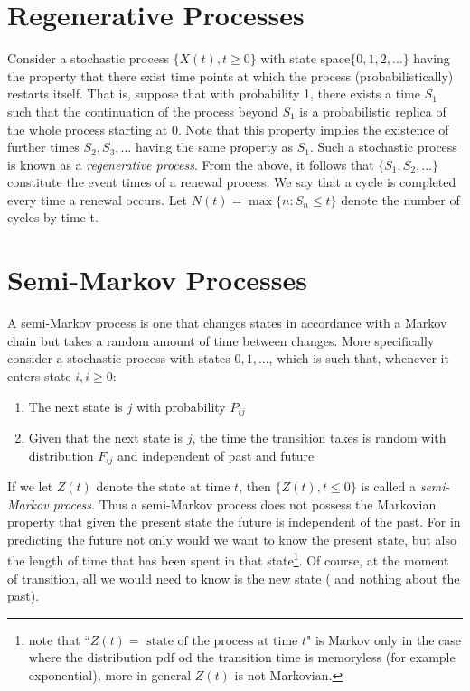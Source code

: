 \section{Regenerative Processes}

Consider a stochastic process $\{X(t), t \geq 0\}$ with state space$\{0, 1, 2, ... \}$ having
the property that there exist time points at which the process (probabilistically) restarts itself. That is, suppose that with probability 1, there exists a time $S_1$
such that the continuation of the process beyond $S_1$ is a probabilistic replica
of the whole process starting at 0. Note that this property implies the existence
of further times $S_2 , S_3 , \dots$ having the same property as $S_1$. Such a stochastic
process is known as a \emph{regenerative process}.
From the above, it follows that $\{S_1 , S_2 , ...\}$ constitute the event times of
a renewal process. We say that a cycle is completed every time a renewal
occurs. Let $N(t) = \max\{n: S_n \leq t\}$ denote the number of cycles by time t.

\section{Semi-Markov Processes}
A semi-Markov process is one that changes states in accordance with a Markov
chain but takes a random amount of time between changes. More specifically
consider a stochastic process with states $0, 1, ...  $, which is such that, whenever
it enters state $i, i\geq 0$:
\begin{enumerate}
	\item The next state is $j$ with probability $P_{ij}$
	\item Given that the next state is $j$, the time the transition takes is random with distribution $F_{ij}$ and independent of past and future
\end{enumerate}
If we let $Z(t)$ denote the state at time $t$, then $\{Z(t), t\leq 0\}$ is called a \emph{semi-Markov
process}.
Thus a semi-Markov process does not possess the Markovian property that
given the present state the future is independent of the past. For in predicting
the future not only would we want to know the present state, but also the
length of time that has been spent in that state\footnote{note that ``$Z(t) = \mbox{ state of the process at time } t$" is Markov only in the case where the distribution pdf od the transition time is memoryless (for example exponential), more in general $Z(t)$ is not Markovian.}. Of course, at the moment of transition, all we would need to know is the new state ( and nothing about
the past). %

